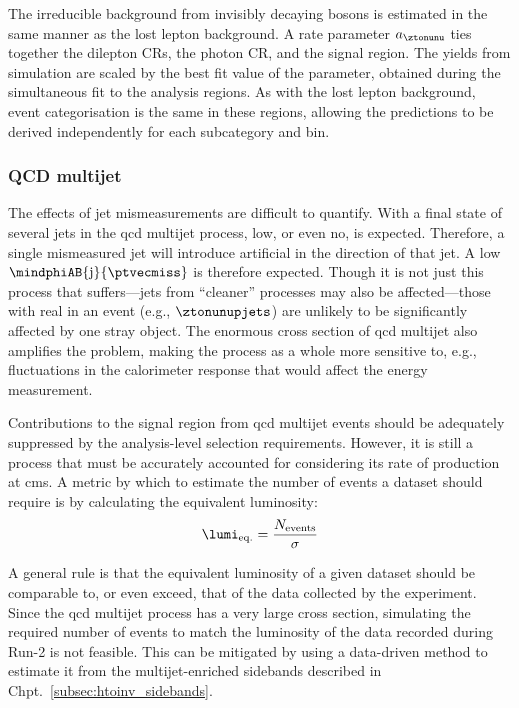 The irreducible background from invisibly decaying \PZ bosons is estimated in the same manner as the lost lepton background. A rate parameter $a_{\ztonunu}$ ties together the dilepton \glspl{CR}, the photon \gls{CR}, and the signal region. The yields from simulation are scaled by the best fit value of the parameter, obtained during the simultaneous fit to the analysis regions. As with the lost lepton background, event categorisation is the same in these regions, allowing the predictions to be derived independently for each subcategory and \ptmiss bin. 




\subsubsection{QCD multijet}
\label{subsubsec:htoinv_qcd_multijet_bkg}

The effects of \gls{jet} mismeasurements are difficult to quantify. With a final state of several \glspl{jet} in the \acrshort{qcd} multijet process, low, or even no, \ptvecmiss is expected. Therefore, a single mismeasured \gls{jet} will introduce artificial \ptvecmiss in the direction of that jet. A low $\mindphiAB{\mathrm{j}}{\ptvecmiss}$ is therefore expected. Though it is not just this process that suffers---\glspl{jet} from ``cleaner'' processes may also be affected---those with real \ptmiss in an event (e.g., $\ztonunupjets$) are unlikely to be significantly affected by one stray object. The enormous cross section of \acrshort{qcd} multijet also amplifies the problem, making the process as a whole more sensitive to, e.g., fluctuations in the calorimeter response that would affect the energy measurement.

Contributions to the signal region from \acrshort{qcd} multijet events should be adequately suppressed by the analysis-level selection requirements. However, it is still a process that must be accurately accounted for considering its rate of production at \acrshort{cms}. A metric by which to estimate the number of events a dataset should require is by calculating the equivalent luminosity:
\begin{equation}
    \lumi_{\mathrm{eq.}} = \frac{N_{\mathrm{events}}}{\sigma}
    \label{eq:equivalent_lumi}
\end{equation}

A general rule is that the equivalent luminosity of a given dataset should be comparable to, or even exceed, that of the data collected by the experiment. Since the \acrshort{qcd} multijet process has a very large cross section, simulating the required number of events to match the luminosity of the data recorded during Run-2 is not feasible. This can be mitigated by using a data-driven method to estimate it from the multijet-enriched sidebands described in Chpt.~\ref{subsec:htoinv_sidebands}.

